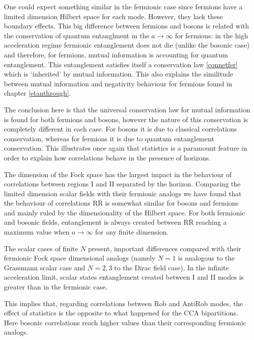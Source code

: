 One could expect something similar in the fermionic case since fermions have a limited dimension Hilbert space for each mode. However, they lack these boundary effects. This big difference between fermions and bosons is related with the conservation of quantum entanglment in the $a\rightarrow\infty$ for fermions: in the high acceleration regime fermionic entanglement does not die (unlike the bosonic case) and therefore, for fermions, mutual information is accounting for quantum entanglement. This entanglement satisfies itself a conservation law \eqref{connetfer} which is `inherited' by mutual information. This also explains the similitude between mutual information and negativity behaviour for fermions found in chapter \ref{etanthrough}.

The conclusion here is that the universal conservation law for mutual information is found for both fermions and bosons, however the nature of this conservation is completely different in each case. For bosons it is due to classical correlations conservation, whereas for fermions it is due to quantum entanglement conservation. This illustrates once again that statistics is a paramount feature in order to explain how correlations behave in the presence of horizons.

The dimension of the Fock space has the largest impact in the behaviour of correlations between regions I and II separated by the horizon. Comparing the limited dimension scalar fields with their fermionic analogs we have found that the behaviour of correlations $\text{R}{\bar{\text{R}}}$ is somewhat similar for bosons and fermions and mainly ruled by the dimensionality of the Hilbert space. For both fermionic and bosonic fields, entanglement is always created between $\text{R}{\bar{\text{R}}}$ reaching a maximum value when $a\rightarrow\infty$ for any finite dimension.

The scalar cases of finite $N$ present, important differences compared with their fermionic Fock space dimensional analogs (namely $N=1$ is analogous to the Grassmann scalar case and $N=2,3$ to the Dirac field case). In the infinite acceleration limit, scalar states entanglement created between I and II modes is greater than in the fermionic case.

This implies that, regarding correlations between Rob and AntiRob modes, the effect of statistics is the opposite to what happened for the CCA bipartitions. Here bosonic correlations reach higher values than their corresponding fermionic analogs. 

